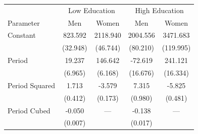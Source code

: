 \begin{tabular}{lcccc}
    \toprule
     & \multicolumn{2}{c}{Low Education} & \multicolumn{2}{c}{High Education} \\
    Parameter & Men & Women & Men & Women \\
    \midrule
    Constant & 823.592 & 2118.940 & 2004.556 & 3471.683 \\
     & (32.948) & (46.744) & (80.210) & (119.995) \\
    Period & 19.237 & 146.642 & -72.619 & 241.121 \\
     & (6.965) & (6.168) & (16.676) & (16.334) \\
    Period Squared & 1.713 & -3.579 & 7.315 & -5.825 \\
     & (0.412) & (0.173) & (0.980) & (0.481) \\
    Period Cubed & -0.050 & --- & -0.138 & --- \\
     & (0.007) &  & (0.017) &  \\
    \bottomrule
\end{tabular}
